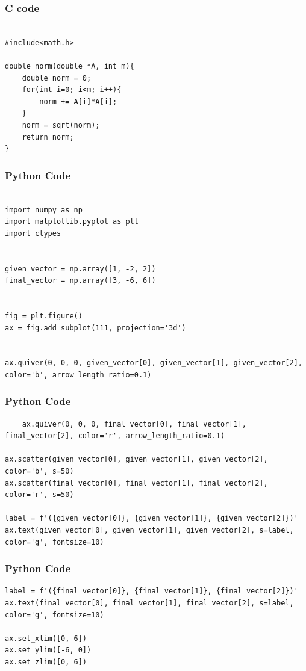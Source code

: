 \documentclass{beamer}
\begin{document}
\begin{frame}[fragile]
\frametitle{C code}
\begin{lstlisting}

#include<math.h>

double norm(double *A, int m){
	double norm = 0;
	for(int i=0; i<m; i++){
		norm += A[i]*A[i];
	}
	norm = sqrt(norm);
	return norm;
}

\end{lstlisting}
\end{frame}

\begin{frame}[fragile]
\frametitle{Python Code}
    \begin{lstlisting}

import numpy as np
import matplotlib.pyplot as plt
import ctypes 


given_vector = np.array([1, -2, 2])
final_vector = np.array([3, -6, 6])


fig = plt.figure()
ax = fig.add_subplot(111, projection='3d')


ax.quiver(0, 0, 0, given_vector[0], given_vector[1], given_vector[2], color='b', arrow_length_ratio=0.1)

\end{lstlisting}
\end{frame}

\begin{frame}[fragile]
\frametitle{Python Code}
\begin{lstlisting}
    ax.quiver(0, 0, 0, final_vector[0], final_vector[1], final_vector[2], color='r', arrow_length_ratio=0.1)

ax.scatter(given_vector[0], given_vector[1], given_vector[2], color='b', s=50)
ax.scatter(final_vector[0], final_vector[1], final_vector[2], color='r', s=50)

label = f'({given_vector[0]}, {given_vector[1]}, {given_vector[2]})'
ax.text(given_vector[0], given_vector[1], given_vector[2], s=label, color='g', fontsize=10)

\end{lstlisting}
\end{frame}

\begin{frame}[fragile]
\frametitle{Python Code}
\begin{lstlisting}
label = f'({final_vector[0]}, {final_vector[1]}, {final_vector[2]})'
ax.text(final_vector[0], final_vector[1], final_vector[2], s=label, color='g', fontsize=10)

ax.set_xlim([0, 6])
ax.set_ylim([-6, 0])
ax.set_zlim([0, 6])

\end{lstlisting}
\end{frame}
\end{document}
